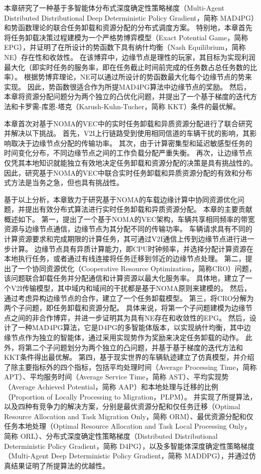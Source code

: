 本章研究了一种基于多智能体分布式深度确定性策略梯度（Multi-Agent Distributed Distributional Deep Deterministic Policy Gradient，简称 MAD4PG）和势函数理论的联合任务卸载和资源分配的分布式调度方案。
特别地，本章首先将任务卸载决策过程建模为一个严格势博弈模型（Exact Potential Game，简称EPG）\cite{chew2016potential}，并证明了在所设计的势函数下具有纳什均衡（Nash Equilibrium，简称 NE）存在性和收敛性。
在该博弈中，边缘节点是理性的玩家，其目标为实现利润最大化（即实时任务的服务率，即在任务截止时间前完成的任务数占总任务数的比率）。
根据势博弈理论，NE可以通过所设计的势函数最大化每个边缘节点的势来实现。
因此，势函数很适合作为所提MAD4PG算法中边缘节点的奖励。
然后，本章将资源分配问题分为两个独立的凸优化问题，并提出了一个基于梯度的迭代方法和卡罗需-库恩-塔克（Karush-Kuhn-Tucher，简称 KKT）条件的最优解。

本章首次对基于NOMA的VEC中的实时任务卸载和异质资源分配进行了联合研究并解决以下挑战。
首先，V2I上行链路受到使用相同信道的车辆干扰的影响，其影响取决于边缘节点分配的传输功率。
其次，由于计算密集型和延迟敏感型任务的时间变化分布，不同边缘节点之间的工作负载分配严重失衡。
再次，让边缘节点仅凭其本地知识就能独立有效地决定任务卸载和资源分配的决策是具有挑战性的。
因此，研究基于NOMA的VEC中联合实时任务卸载和异质资源分配的有效和分布式方法是当务之急，但也具有挑战性。

基于以上分析，本章致力于研究基于NOMA的车载边缘计算中协同资源优化问题，并提出有效分布式算法进行实时任务卸载和异质资源分配。
本章的主要贡献概述如下。
第一，提出了一个基于NOMA的VEC架构，车辆共享相同频率的带宽资源与边缘节点通信，边缘节点为其分配不同的传输功率。
车辆请求具有不同的计算资源要求和完成期限的计算任务，其可通过V2I通信上传到边缘节点进行进一步计算。
边缘节点具有异质计算能力，即CPU时钟频率，并选择分配计算资源在本地执行任务，或者通过有线连接将任务迁移到邻近的边缘节点处理。
第二，提出了一个协同资源优化（Cooperative Resource Optimization，简称CRO）问题，该问题联合卸载任务并分配通信和计算资源以最大化服务率。
具体地，建立了一个V2I传输模型，其中域内和域间的干扰都是基于NOMA原则来建模的。
然后，通过考虑异构边缘节点的合作，建立了一个任务卸载模型。
第三，将CRO分解为两个子问题，即任务卸载和资源分配。
具体来说，将第一个子问题建模为边缘节点之间的非合作博弈，并进一步证明其为具有NE存在和收敛性的EPG。
然后，设计了一种MAD4PG算法，它是D4PG的多智能体版本\cite{barth2018distributed}，以实现纳什均衡，其中边缘节点作为独立的智能体，通过采用实现势作为奖励来决定任务卸载的动作。
此外，将第二个子问题划分为两个独立的凸问题，并基于基于梯度的迭代方法和KKT条件得出最优解。
第四，基于现实世界的车辆轨迹建立了仿真模型，并介绍了除主要指标外的四个指标，包括平均处理时间（Average Processing Time，简称 APT）、平均服务时间（Average Service Time，简称 AST）、平均实现势（Average Achieved Potential，简称 AAP）和本地处理与迁移的比例（Proportion of Locally Processing to Migration，PLPM）。
并实现了所提算法，以及四种有竞争力的解决方案，分别是最优资源分配和仅任务迁移（Optimal Resource Allocation and Task Migration Only，简称 ORM）、最优资源分配和仅任务本地处理（Optimal Resource Allocation and Task Local Processing Only，简称 ORL）、分布式深度确定性策略梯度（Distributed Distributional Deterministic Policy Gradient，简称 D4PG）\cite{barth2018distributed}，以及多智能体深度确定性策略梯度（Multi-Agent Deep Deterministic Policy Gradient，简称 MADDPG）\cite{zhang2021adaptive}，并通过仿真结果证明了所提算法的优越性。

